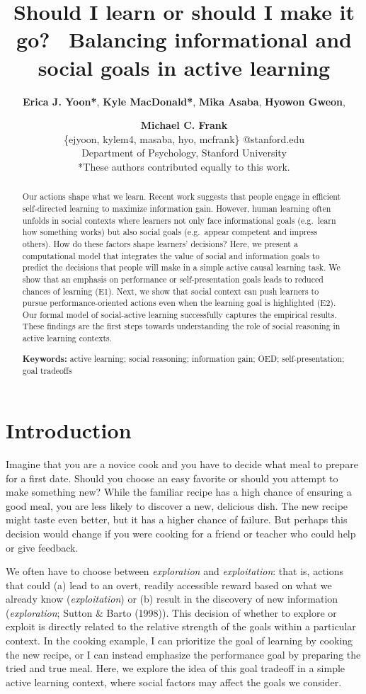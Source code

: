 \documentclass[10pt, letterpaper]{article}
\title{Should I learn or should I make it go? ~Balancing informational and
social goals in active learning}
\author{{\large \bf Erica J. Yoon*}, {\large \bf Kyle MacDonald*}, {\large \bf Mika Asaba}, {\large \bf Hyowon Gweon}, \and {\large \bf Michael C. Frank} \\ \{ejyoon, kylem4, masaba, hyo, mcfrank\} @stanford.edu \\ Department of Psychology, Stanford University \\ *These authors contributed equally to this work.}
\begin{document}
\maketitle

\begin{abstract}
Our actions shape what we learn. Recent work suggests that people engage
in efficient self-directed learning to maximize information gain.
However, human learning often unfolds in social contexts where learners
not only face informational goals (e.g.~learn how something works) but
also social goals (e.g.~appear competent and impress others). How do
these factors shape learners' decisions? Here, we present a
computational model that integrates the value of social and information
goals to predict the decisions that people will make in a simple active
causal learning task. We show that an emphasis on performance or
self-presentation goals leads to reduced chances of learning (E1). Next,
we show that social context can push learners to pursue
performance-oriented actions even when the learning goal is highlighted
(E2). Our formal model of social-active learning successfully captures
the empirical results. These findings are the first steps towards
understanding the role of social reasoning in active learning contexts.

\textbf{Keywords:}
active learning; social reasoning; information gain; OED;
self-presentation; goal tradeoffs
\end{abstract}

\section{Introduction}\label{introduction}

Imagine that you are a novice cook and you have to decide what meal to
prepare for a first date. Should you choose an easy favorite or should
you attempt to make something new? While the familiar recipe has a high
chance of ensuring a good meal, you are less likely to discover a new,
delicious dish. The new recipe might taste even better, but it has a
higher chance of failure. But perhaps this decision would change if you
were cooking for a friend or teacher who could help or give feedback.

We often have to choose between \emph{exploration} and
\emph{exploitation}: that is, actions that could (a) lead to an overt,
readily accessible reward based on what we already know
(\emph{exploitation}) or (b) result in the discovery of new information
(\emph{exploration}; Sutton \& Barto (1998)). This decision of whether
to explore or exploit is directly related to the relative strength of
the goals within a particular context. In the cooking example, I can
prioritize the goal of learning by cooking the new recipe, or I can
instead emphasize the performance goal by preparing the tried and true
meal. Here, we explore the idea of this goal tradeoff in a simple active
learning context, where social factors may affect the goals we consider.
\end{document}
